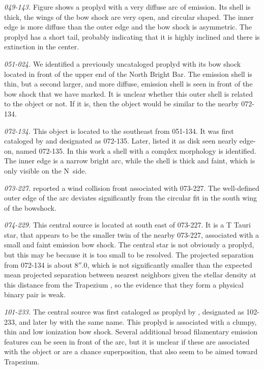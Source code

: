 \documentclass[iop, apj]{emulateapj}
\begin{document}
\textit{049-143.} Figure shows a proplyd \citep{Ricci:2008a} with a very diffuse arc of emission. Its shell is thick, the wings of the bow shock are very open, and circular shaped. The inner edge is more diffuse than the outer edge and the bow shock is asymmetric. The  proplyd has a short tail, probably indicating that it is highly inclined and there is extinction in the center. 
 
\textit{051-024.} We identified a previously uncataloged proplyd with its bow shock located in front of the upper end of the North Bright
Bar. The emission shell is thin, but a second larger, and more diffuse, emission shell is seen in front of the bow shock that we have
marked. It is unclear whether this outer shell is related to the object or not. If it is, then the object would be similar to the nearby 072-134. 

\textit{072-134.} This object is located to the southeast from 051-134. It was first cataloged by \citet{ODell:1996a} and designated as 072-135. Later, \citet{Ricci:2008a} listed it as disk seen nearly edge-on, named 072-135. In this work a shell with a complex morphology is identified. The inner edge is a narrow bright arc, while the shell is thick and faint, which is only visible on the N~side.                 

\textit{073-227.} \citet{Bally:2000a} reported a wind collision front associated with 073-227. The well-defined outer edge of the arc deviates significantly from the circular fit in the south wing of the bowshock.
   
\textit{074-229.} This central source is located at south east of 073-227. It is a T Tauri star, that appears to be the smaller twin of the nearby 073-227, associated with a small and faint emission bow shock. The central star is not obviously a proplyd, but this may be because it is too small to be resolved. The projected separation from 072-134 is about \(8''.0\), which is not significantly smaller than the expected mean projected separation between nearest neighbors given the stellar density at this distance from the Trapezium \citep{Reipurth:2007a}, 
so the evidence that they form a physical binary pair is weak.

\textit{101-233.} The central source was first cataloged as proplyd by \citet{ODell:1996a}, designated as 102-233, and later by \citet{Ricci:2008a} with the same name. This proplyd is associated with a clumpy, thin and low ionization bow shock. Several additional broad filamentary emission features can be seen in front of the arc, but it is unclear if these are associated with the object or are a chance superposition, that also seem to be aimed toward Trapezium. 
\end{document}
